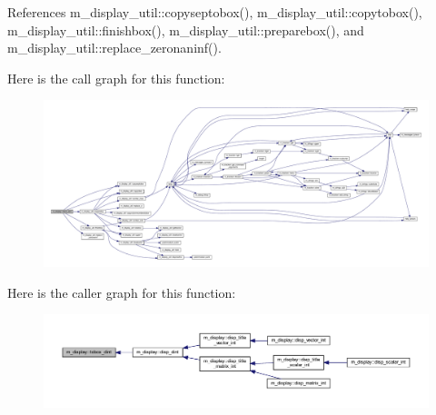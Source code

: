 References m\+\_\+display\+\_\+util\+::copyseptobox(), m\+\_\+display\+\_\+util\+::copytobox(), m\+\_\+display\+\_\+util\+::finishbox(), m\+\_\+display\+\_\+util\+::preparebox(), and m\+\_\+display\+\_\+util\+::replace\+\_\+zeronaninf().

Here is the call graph for this function\+:
\nopagebreak
\begin{figure}[H]
\begin{center}
\leavevmode
\includegraphics[width=350pt]{namespacem__display_a305dbf4f9072f9d1551a24c0f26ad508_cgraph}
\end{center}
\end{figure}
Here is the caller graph for this function\+:
\nopagebreak
\begin{figure}[H]
\begin{center}
\leavevmode
\includegraphics[width=350pt]{namespacem__display_a305dbf4f9072f9d1551a24c0f26ad508_icgraph}
\end{center}
\end{figure}
\mbox{\label{namespacem__display_abaf23628781d863ca3d9bba0b3b01707}} 
